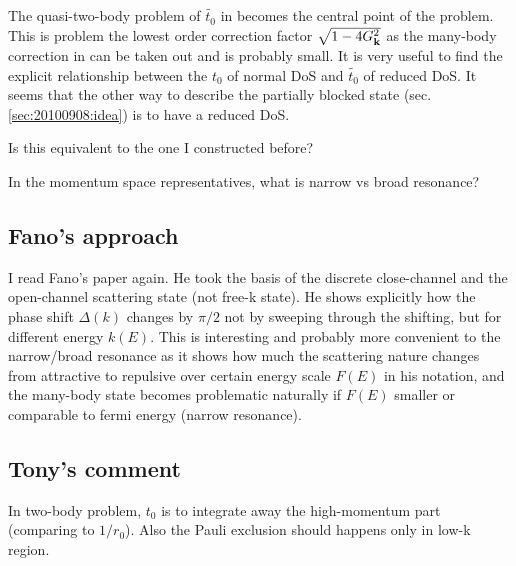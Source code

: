 \subsection{}
The quasi-two-body problem of $\tilde{t_{0}}$ in  becomes the central point of the problem. This is problem the lowest order correction factor $\sqrt{1-4 G_{\mathbf{k}}^2}$ as the many-body correction  in   can be taken out and is probably small.      It is very useful to find the explicit relationship between the $t_{0}$ of normal DoS and $\tilde{t_{0}}$ of  reduced DoS.  It seems that the other way to describe the partially blocked state (sec. \ref{sec:20100908:idea}) is to have a reduced DoS.  

Is this equivalent to the one I constructed before?

In the momentum space representatives, what is narrow vs broad resonance?

\subsection{Fano's approach}
I read Fano's paper\cite{Fano} again.  He took the basis of the discrete close-channel and the open-channel scattering state (not free-k state).  He shows explicitly how the phase shift $\Delta(k)$ changes by $\pi/2$ not by sweeping through the shifting, but for different energy $k(E)$.  This is interesting and probably more convenient  to the narrow/broad resonance as it shows how much the scattering nature changes from attractive to repulsive over certain energy scale $F(E)$ in his notation, and the many-body state becomes problematic naturally if $F(E)$ smaller or comparable to fermi energy (narrow resonance).

\subsection{Tony's comment}
In two-body problem, $t_{0}$ is to integrate away the high-momentum part (comparing to $1/r_{0}$).  Also the Pauli exclusion should happens only in low-k region.  

